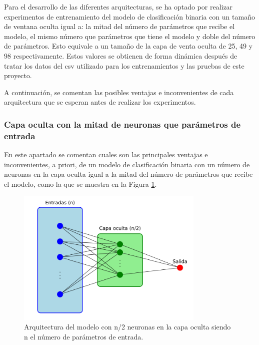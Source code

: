Para el desarrollo de las diferentes arquitecturas, se ha optado por realizar experimentos de entrenamiento del modelo de clasificación binaria con un tamaño de ventana oculta igual a:
la mitad del número de parámetros que recibe el modelo, el mismo número que parámetros que tiene el modelo y doble del número de parámetros. Esto equivale a un tamaño de la capa de venta oculta de 25, 49 y 98 respectivamente. Estos valores se obtienen de forma dinámica después de tratar los datos del csv  utilizado para los entrenamientos y las pruebas de este proyecto.

A continuación, se comentan las posibles ventajas e inconvenientes de cada arquitectura que se esperan antes de realizar los experimentos.

\subsubsection{Capa oculta con la mitad de neuronas que parámetros de entrada}\label{sec:VIBIN25}
En este apartado se comentan cuales son las principales ventajas e inconvenientes, a priori, de un modelo de clasificación binaria con un número de neuronas en la capa oculta igual a la mitad del número de parámetros que recibe el modelo, como la que se muestra en la Figura \ref{fig:arqnmediosBIN}.

\begin{figure}[H]
    \centering
    \includegraphics[width=0.8\textwidth]{./img/modelo/arqnmediosBIN.pdf}
    \caption{Arquitectura del modelo con n/2 neuronas en la capa oculta siendo n el número de parámetros de entrada.}
    \label{fig:arqnmediosBIN}
\end{figure}

